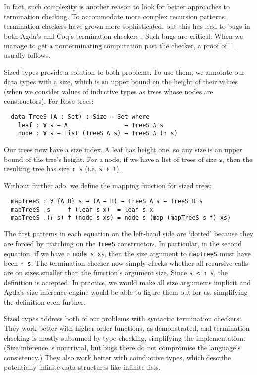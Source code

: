 \documentclass{scrartcl}
\newcommand*{\cod}[1]{\texttt{#1}}
\begin{document}
In fact, such complexity is another reason to look for better approaches to
termination checking. To accommodate more complex recursion patterns,
termination checkers have grown more sophisticated, but this has lead to bugs in
both Agda's and Coq's termination checkers \cite{coqbug2013, agdabug2013}. Such
bugs are critical: When we manage to get a nonterminating computation past the
checker, a proof of $⊥$ usually follows.

Sized types provide a solution to both problems. To use them, we annotate our
data types with a size, which is an upper bound on the height of their values
(when we consider values of inductive types as trees whose nodes are
constructors). For Rose trees:
\begin{verbatim}
  data TreeS (A : Set) : Size → Set where
    leaf : ∀ s → A                → TreeS A s
    node : ∀ s → List (TreeS A s) → TreeS A (↑ s)
\end{verbatim}
Our trees now have a size index. A leaf has height one, so any size is an upper
bound of the tree's height. For a node, if we have a list of trees of size
\cod{s}, then the resulting tree has size \cod{↑~s} (i.e. \cod{s~+~1}).

Without further ado, we define the mapping function for sized trees:
\begin{verbatim}
  mapTreeS : ∀ {A B} s → (A → B) → TreeS A s → TreeS B s
  mapTreeS .s     f (leaf s x)  = leaf s x
  mapTreeS .(↑ s) f (node s xs) = node s (map (mapTreeS s f) xs)
\end{verbatim}
The first patterns in each equation on the left-hand side are \enquote*{dotted}
because they are forced by matching on the \cod{TreeS} constructors. In
particular, in the second equation, if we have a \cod{node~s~xs}, then the size
argument to \cod{mapTreeS} must have been \cod{↑~s}. The termination checker
now simply checks whether all recursive calls are on sizes smaller than the
function's argument size. Since \cod{s~<~↑~s}, the definition is accepted. In
practice, we would make all size arguments implicit and Agda's size inference
engine would be able to figure them out for us, simplifying the definition even
further.

Sized types address both of our problems with syntactic termination checkers:
They work better with higher-order functions, as demonstrated, and termination
checking is mostly subsumed by type checking, simplifying the implementation.
(Size inference is nontrivial, but bugs there do not compromise the language's
consistency.) They also work better with coinductive types, which describe
potentially infinite data structures like infinite lists.
\end{document}
